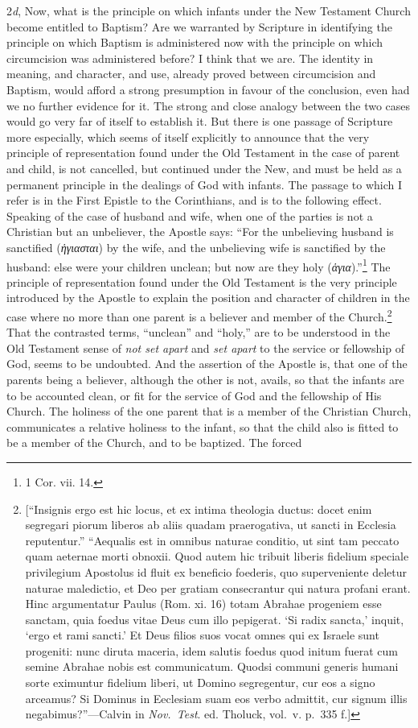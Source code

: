 \documentclass[english,]{book}
\begin{document}
2\emph{d}, Now, what is the principle on which infants under the New Testament Church become entitled to Baptism? Are we warranted by Scripture in identifying the principle on which Baptism is administered now with the principle on which circumcision was administered before? I think that we are. The identity in meaning, and character, and use, already proved between circumcision and Baptism, would afford a strong presumption in favour of the conclusion, even had we no further evidence for it. The strong and close analogy between the two cases would go very far of itself to establish it. But there is one passage of Scripture more especially, which seems of itself explicitly to announce that the very principle of representation found under the Old Testament in the case of parent and child, is not cancelled, but continued under the New, and must be held as a permanent principle in the dealings of God with infants. The passage to which I refer is in the First Epistle to the Corinthians, and is to the following effect. Speaking of the case of husband and wife, when one of the parties is not a Christian but an unbeliever, the Apostle says: ``For the unbelieving husband is sanctified (\emph{ἡγιασται}) by the wife, and the unbelieving wife is sanctified by the husband: else were your children unclean; but now are they holy (\emph{ἁγια}).''\footnote{1 Cor. vii. 14.} The principle of representation found under the Old Testament is the very principle introduced by the Apostle to explain the position and character of children in the case where no more than one parent is a believer and member of the Church.\footnote{{[}``Insignis ergo est hic locus, et ex intima theologia ductus: docet enim segregari piorum liberos ab aliis quadam praerogativa, ut sancti in Ecclesia reputentur.'' ``Aequalis est in omnibus naturae conditio, ut sint tam peccato quam aeternae morti obnoxii. Quod autem hic tribuit liberis fidelium speciale privilegium Apostolus id fluit ex beneficio foederis, quo superveniente deletur naturae maledictio, et Deo per gratiam consecrantur qui natura profani erant. Hinc argumentatur Paulus (Rom. xi. 16) totam Abrahae progeniem esse sanctam, quia foedus vitae Deus cum illo pepigerat. `Si radix sancta,' inquit, `ergo et rami sancti.' Et Deus filios suos vocat omnes qui ex Israele sunt progeniti: nunc diruta maceria, idem salutis foedus quod initum fuerat cum semine Abrahae nobis est communicatum. Quodsi communi generis humani sorte eximuntur fidelium liberi, ut Domino segregentur, cur eos a signo arceamus? Si Dominus in Eeclesiam suam eos verbo admittit, cur signum illis negabimus?''---Calvin in \emph{Nov.~Test}. ed. Tholuck, vol.~v. p.~335 f.{]}} That the contrasted terms, ``unclean'' and ``holy,'' are to be understood in the Old Testament sense of \emph{not set apart} and \emph{set apart} to the service or fellowship of God, seems to be undoubted. And the assertion of the Apostle is, that one of the parents being a believer, although the other is not, avails, so that the infants are to be accounted clean, or fit for the service of God and the fellowship of His Church. The holiness of the one parent that is a member of the Christian Church, communicates a relative holiness to the infant, so that the child also is fitted to be a member of the Church, and to be baptized. The forced 
\end{document}
